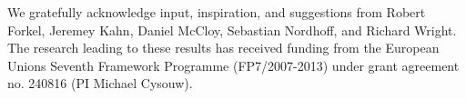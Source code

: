\begin{refsection}

We gratefully acknowledge input, inspiration, and suggestions from Robert Forkel, Jeremey Kahn, Daniel McCloy, Sebastian Nordhoff, and Richard Wright. The research leading to these results has received funding from the European Unions Seventh Framework Programme (FP7/2007-2013) under grant agreement no. 240816 (PI Michael Cysouw).

\printbibliography[heading=subbibliography]
\end{refsection}

